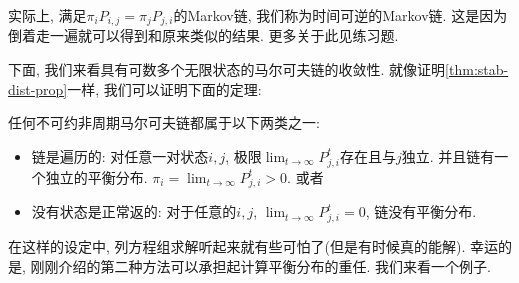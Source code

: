 实际上, 满足$\pi_i P_{i, j}=\pi_j P_{j, i}$的Markov链, 我们称为时间可逆的Markov链. 这是因为倒着走一遍就可以得到和原来类似的结果. 更多关于此见练习题. 

下面, 我们来看具有可数多个无限状态的马尔可夫链的收敛性. 就像证明\cref{thm:stab-dist-prop}一样, 我们可以证明下面的定理: 

\begin{theorem}
    任何不可约非周期马尔可夫链都属于以下两类之一: 
    \begin{itemize}
        \item 链是遍历的: 对任意一对状态$i,j$, 极限$\lim _{t \rightarrow \infty} P_{j, i}^t$存在且与$j$独立. 并且链有一个独立的平衡分布. $\pi_i = \lim _{t \rightarrow \infty} P_{j, i}^t>0$. 或者
        \item 没有状态是正常返的: 对于任意的$i,j$, $\lim _{t \rightarrow \infty} P_{j, i}^t=0$, 链没有平衡分布. 
    \end{itemize}
\end{theorem}

在这样的设定中, 列方程组求解听起来就有些可怕了(但是有时候真的能解). 幸运的是, 刚刚介绍的第二种方法可以承担起计算平衡分布的重任. 我们来看一个例子. 

